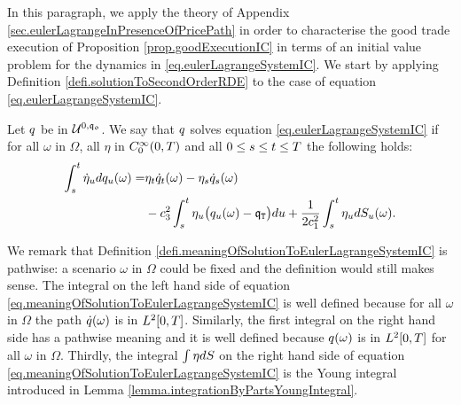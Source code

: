 \documentclass[10pt,a4paper]{article}
\begin{document}
In this  paragraph, we apply the theory of Appendix \ref{sec.eulerLagrangeInPresenceOfPricePath} in order to characterise the good trade execution of Proposition \ref{prop.goodExecutionIC} in terms of an initial value problem for the dynamics in \eqref{eq.eulerLagrangeSystemIC}. We start by applying Definition \ref{defi.solutionToSecondOrderRDE} to the case of equation \eqref{eq.eulerLagrangeSystemIC}.
\begin{defi}\label{defi.meaningOfSolutionToEulerLagrangeSystemIC}
Let $q$ be in $\mathcal{U}^{0,\mathfrak{q_0}}$. We say that $q$ solves equation \eqref{eq.eulerLagrangeSystemIC} if for all $\omega$ in $\Omega$, all $\eta$ in $C^{\infty}_{0} (0,T)$ and all $0\leq s\leq t \leq T$ the following holds:
\begin{equation}
\label{eq.meaningOfSolutionToEulerLagrangeSystemIC}
\begin{split}
\int_{s}^{t} \dot{\eta}_u dq_u (\omega) 
=& \eta_t \dot{q}_{t}(\omega) - \eta_s \dot{q}_s (\omega) \\
& - c_{3}^{2} 	\int_{s}^{t} \eta_u \big(q_u (\omega) - \mathfrak{q}_{\mathtt{T} }\big) du 
+ \frac{1}{2c_{1}^{2}} 	\int_{s}^{t} \eta_{u} dS_u (\omega).
\end{split}
\end{equation}
\end{defi}
We remark that Definition \ref{defi.meaningOfSolutionToEulerLagrangeSystemIC} is pathwise: a scenario $\omega$ in $\Omega$ could be fixed and the definition would still makes sense. The integral on the left hand side of equation \eqref{eq.meaningOfSolutionToEulerLagrangeSystemIC} is well defined because for all $\omega$ in $\Omega$ the path $\dot{q}(\omega)$ is in $L^{2} {[0,T]}$. Similarly, the first integral on the right hand side has a pathwise meaning and it is well defined because $q(\omega)$ is in $L^{2} {[0,T]}$ for all  $\omega$ in $\Omega$. Thirdly, the integral $\int \eta dS$ on the right hand side of equation \eqref{eq.meaningOfSolutionToEulerLagrangeSystemIC} is the Young integral introduced in Lemma \ref{lemma.integrationByPartsYoungIntegral}.
\end{document}
